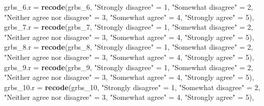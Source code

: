 \documentclass[
]{article}
\newenvironment{Shaded}{\begin{snugshade}}{\end{snugshade}}
\newcommand{\DataTypeTok}[1]{\textcolor[rgb]{0.13,0.29,0.53}{#1}}
\newcommand{\DecValTok}[1]{\textcolor[rgb]{0.00,0.00,0.81}{#1}}
\newcommand{\KeywordTok}[1]{\textcolor[rgb]{0.13,0.29,0.53}{\textbf{#1}}}
\newcommand{\NormalTok}[1]{#1}
\newcommand{\StringTok}[1]{\textcolor[rgb]{0.31,0.60,0.02}{#1}}
\begin{document}
\begin{Shaded}
\begin{Highlighting}[]
         \DataTypeTok{grbs\_6.r =} \KeywordTok{recode}\NormalTok{(grbs\_}\DecValTok{6}\NormalTok{,  }\StringTok{"Strongly disagree"}\NormalTok{ =}\StringTok{ }\DecValTok{1}\NormalTok{, }\StringTok{"Somewhat disagree"}\NormalTok{ =}\StringTok{ }\DecValTok{2}\NormalTok{, }\StringTok{"Neither agree nor disagree"}\NormalTok{ =}\StringTok{ }\DecValTok{3}\NormalTok{, }\StringTok{"Somewhat agree"}\NormalTok{ =}\StringTok{ }\DecValTok{4}\NormalTok{, }\StringTok{"Strongly agree"}\NormalTok{ =}\StringTok{ }\DecValTok{5}\NormalTok{),}
         \DataTypeTok{grbs\_7.r =} \KeywordTok{recode}\NormalTok{(grbs\_}\DecValTok{7}\NormalTok{,  }\StringTok{"Strongly disagree"}\NormalTok{ =}\StringTok{ }\DecValTok{1}\NormalTok{, }\StringTok{"Somewhat disagree"}\NormalTok{ =}\StringTok{ }\DecValTok{2}\NormalTok{, }\StringTok{"Neither agree nor disagree"}\NormalTok{ =}\StringTok{ }\DecValTok{3}\NormalTok{, }\StringTok{"Somewhat agree"}\NormalTok{ =}\StringTok{ }\DecValTok{4}\NormalTok{, }\StringTok{"Strongly agree"}\NormalTok{ =}\StringTok{ }\DecValTok{5}\NormalTok{),}
         \DataTypeTok{grbs\_8.r =} \KeywordTok{recode}\NormalTok{(grbs\_}\DecValTok{8}\NormalTok{,  }\StringTok{"Strongly disagree"}\NormalTok{ =}\StringTok{ }\DecValTok{1}\NormalTok{, }\StringTok{"Somewhat disagree"}\NormalTok{ =}\StringTok{ }\DecValTok{2}\NormalTok{, }\StringTok{"Neither agree nor disagree"}\NormalTok{ =}\StringTok{ }\DecValTok{3}\NormalTok{, }\StringTok{"Somewhat agree"}\NormalTok{ =}\StringTok{ }\DecValTok{4}\NormalTok{, }\StringTok{"Strongly agree"}\NormalTok{ =}\StringTok{ }\DecValTok{5}\NormalTok{),}
         \DataTypeTok{grbs\_9.r =} \KeywordTok{recode}\NormalTok{(grbs\_}\DecValTok{9}\NormalTok{,  }\StringTok{"Strongly disagree"}\NormalTok{ =}\StringTok{ }\DecValTok{1}\NormalTok{, }\StringTok{"Somewhat disagree"}\NormalTok{ =}\StringTok{ }\DecValTok{2}\NormalTok{, }\StringTok{"Neither agree nor disagree"}\NormalTok{ =}\StringTok{ }\DecValTok{3}\NormalTok{, }\StringTok{"Somewhat agree"}\NormalTok{ =}\StringTok{ }\DecValTok{4}\NormalTok{, }\StringTok{"Strongly agree"}\NormalTok{ =}\StringTok{ }\DecValTok{5}\NormalTok{),}
         \DataTypeTok{grbs\_10.r =} \KeywordTok{recode}\NormalTok{(grbs\_}\DecValTok{10}\NormalTok{,  }\StringTok{"Strongly disagree"}\NormalTok{ =}\StringTok{ }\DecValTok{1}\NormalTok{, }\StringTok{"Somewhat disagree"}\NormalTok{ =}\StringTok{ }\DecValTok{2}\NormalTok{, }\StringTok{"Neither agree nor disagree"}\NormalTok{ =}\StringTok{ }\DecValTok{3}\NormalTok{, }\StringTok{"Somewhat agree"}\NormalTok{ =}\StringTok{ }\DecValTok{4}\NormalTok{, }\StringTok{"Strongly agree"}\NormalTok{ =}\StringTok{ }\DecValTok{5}\NormalTok{),}

\end{Highlighting}
\end{Shaded}
\end{document}
